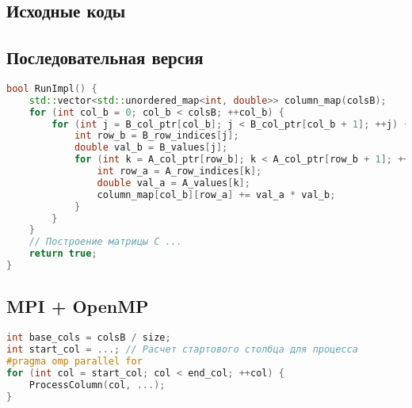 \documentclass[12pt]{article}
\begin{document}
\newpage
\begin{appendices}
\section{Исходные коды}
\subsection{Последовательная версия}
\begin{lstlisting}[language=C++, caption=RunImpl из ops\_seq.cpp]
bool RunImpl() {
    std::vector<std::unordered_map<int, double>> column_map(colsB);
    for (int col_b = 0; col_b < colsB; ++col_b) {
        for (int j = B_col_ptr[col_b]; j < B_col_ptr[col_b + 1]; ++j) {
            int row_b = B_row_indices[j];
            double val_b = B_values[j];
            for (int k = A_col_ptr[row_b]; k < A_col_ptr[row_b + 1]; ++k) {
                int row_a = A_row_indices[k];
                double val_a = A_values[k];
                column_map[col_b][row_a] += val_a * val_b;
            }
        }
    }
    // Построение матрицы C ...
    return true;
}
\end{lstlisting}

\subsection{MPI + OpenMP}
\begin{lstlisting}[language=C++, caption=Распределение столбцов в MPI]
int base_cols = colsB / size;
int start_col = ...; // Расчет стартового столбца для процесса
#pragma omp parallel for
for (int col = start_col; col < end_col; ++col) {
    ProcessColumn(col, ...);
}
\end{lstlisting}
\end{appendices}
\end{document}
